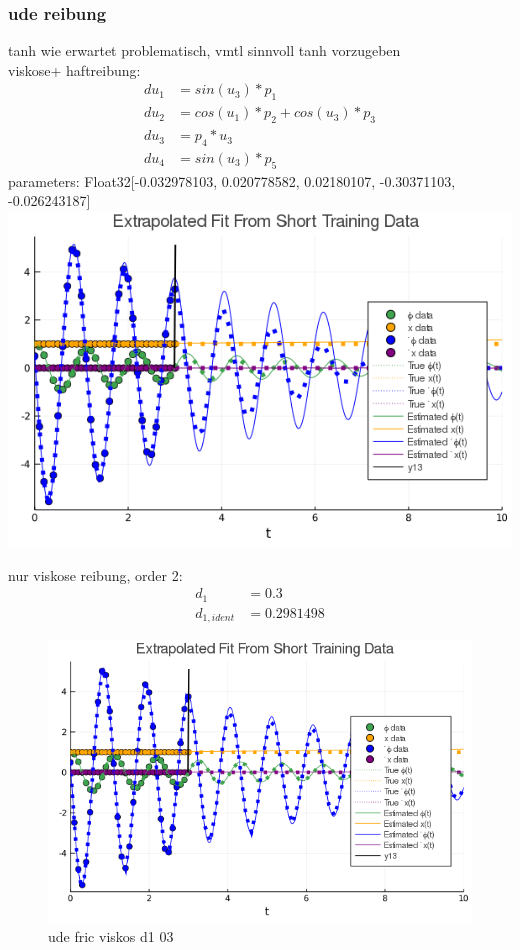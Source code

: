 \documentclass[arbeit=studie,oneside,BCOR=12mm]{ArbeitRST}
\begin{document}
\subsubsection{ude reibung}
tanh wie erwartet problematisch, vmtl sinnvoll tanh vorzugeben\\
viskose+ haftreibung:
\begin{align*}
du_1 &= sin(u_3) * p_1\\
du_2 &= cos(u_1) * p_2 + cos(u_3) * p_3\\
du_3 &= p_4 * u_3\\
du_4 &= sin(u_3) * p_5
\end{align*}
parameters: Float32[-0.032978103, 0.020778582, 0.02180107, -0.30371103, -0.026243187]
\includegraphics[width=1\textwidth]{images/ude_fric_order_4}

nur viskose reibung, order 2:\\
\begin{align*}
d_1&=0.3\\
d_{1, ident}&= 0.2981498
\end{align*}

\begin{figure}
\includegraphics[width=1\textwidth]{images/ude_fric_viskos_d1_03}
\caption{ude fric viskos d1 03}
\end{figure}
\end{document}
